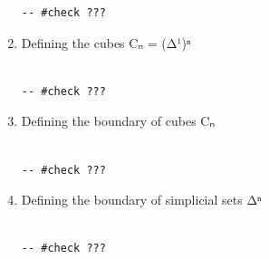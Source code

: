 \documentclass{book}
\theoremstyle{definition}
\newcounter{lcounter}
\begin{document}
\begin{enumerate}
\begin{center}
\begin{tcolorbox}[width=5in,colback={white},title={\begin{center}\texttt{Lean \thelcounter} \addtocounter{lcounter}{1}  \end{center}},colbacktitle=Blue,coltitle=black]
\begin{verbatim}
-- #check ???

\end{verbatim}
\end{tcolorbox}
\end{center}

\item Defining the cubes Cₙ = (Δ¹)ⁿ

\begin{center}
\begin{tcolorbox}[width=5in,colback={white},title={\begin{center}\texttt{Lean \thelcounter} \addtocounter{lcounter}{1}  \end{center}},colbacktitle=Blue,coltitle=black]
\begin{verbatim}

-- #check ???

\end{verbatim}
\end{tcolorbox}
\end{center}

\item Defining the boundary of cubes Cₙ

\begin{center}
\begin{tcolorbox}[width=5in,colback={white},title={\begin{center}\texttt{Lean \thelcounter} \addtocounter{lcounter}{1}  \end{center}},colbacktitle=Blue,coltitle=black]
\begin{verbatim}

-- #check ???

\end{verbatim}
\end{tcolorbox}
\end{center}

\item Defining the boundary of simplicial sets Δⁿ

\begin{center}
\begin{tcolorbox}[width=5in,colback={white},title={\begin{center}\texttt{Lean \thelcounter} \addtocounter{lcounter}{1}  \end{center}},colbacktitle=Blue,coltitle=black]
\begin{verbatim}

-- #check ???

\end{verbatim}
\end{tcolorbox}
\end{center}
\end{enumerate}
\end{document}
